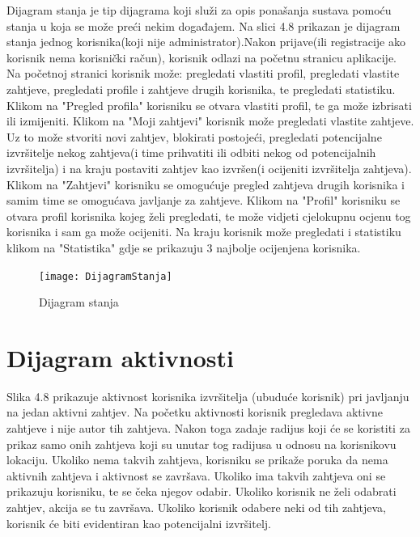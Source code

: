 			Dijagram stanja je tip dijagrama koji služi za opis ponašanja sustava pomoću stanja u koja se može preći nekim događajem. Na slici 4.8 prikazan je dijagram stanja jednog korisnika(koji nije administrator).Nakon prijave(ili registracije ako korisnik nema korisnički račun), korisnik odlazi na početnu stranicu aplikacije. Na početnoj stranici korisnik može: pregledati vlastiti profil, pregledati vlastite zahtjeve, pregledati profile i zahtjeve drugih korisnika, te pregledati statistiku. Klikom na "Pregled profila" korisniku se otvara vlastiti profil, te ga može izbrisati ili izmijeniti. Klikom na "Moji zahtjevi" korisnik može pregledati vlastite zahtjeve. Uz to može stvoriti novi zahtjev, blokirati postojeći, pregledati potencijalne izvršitelje nekog zahtjeva(i time prihvatiti ili odbiti nekog od potencijalnih izvršitelja) i na kraju postaviti zahtjev kao izvršen(i ocijeniti izvršitelja zahtjeva).
			Klikom na "Zahtjevi" korisniku se omogućuje pregled zahtjeva drugih korisnika i samim time se omogućava javljanje za zahtjeve. Klikom na "Profil" korisniku se otvara profil korisnika kojeg želi pregledati, te može vidjeti cjelokupnu ocjenu tog korisnika i sam ga može ocijeniti. Na kraju korisnik može pregledati i statistiku klikom na "Statistika" gdje se prikazuju 3 najbolje ocijenjena korisnika. 
			
			\begin{figure}[h]
				\texttt{[image: DijagramStanja]}
				\caption{Dijagram stanja}
			\end{figure}
			
			\eject 
		
		\section{Dijagram aktivnosti}
		
			Slika 4.8 prikazuje aktivnost korisnika izvršitelja (ubuduće korisnik) pri javljanju na jedan aktivni zahtjev. Na početku aktivnosti korisnik pregledava aktivne zahtjeve i nije autor tih zahtjeva. Nakon toga zadaje radijus koji će se koristiti za prikaz samo onih zahtjeva koji su unutar tog radijusa u odnosu na korisnikovu lokaciju. Ukoliko nema takvih zahtjeva, korisniku se prikaže poruka da nema aktivnih zahtjeva i aktivnost se završava. Ukoliko ima takvih zahtjeva oni se prikazuju korisniku, te se čeka njegov odabir. Ukoliko korisnik ne želi odabrati zahtjev, akcija se tu završava. Ukoliko korisnik odabere neki od tih zahtjeva, korisnik će biti evidentiran kao potencijalni izvršitelj.
		
